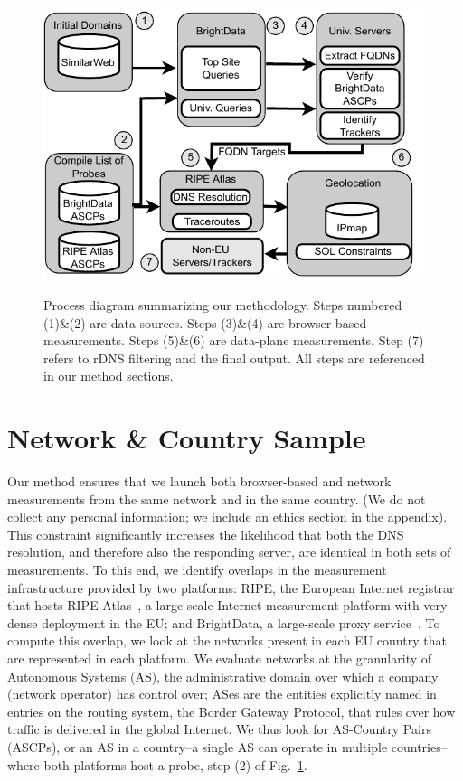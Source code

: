 

\begin{figure}
\vspace{-4mm}
    \centering
    \includegraphics[width=.46\textwidth]{figures/DataLoc-Methodology-v2.pdf}\\
    \caption{Process diagram summarizing our methodology. Steps numbered (1)\&(2) are data sources. 
Steps (3)\&(4) are browser-based measurements. Steps (5)\&(6) are data-plane measurements. 
Step (7) refers to rDNS filtering and the final output. All steps are referenced in our method sections.}
\label{fig:methodoverview}
\vspace{-4mm}
\end{figure}

\section{Network \& Country Sample}
Our method ensures that we launch both browser-based and network measurements
from the same network and in the same country. (We do not collect any personal 
information; we include an ethics section in the appendix). This constraint significantly increases the likelihood 
that both the DNS resolution, and therefore also the responding server, are 
identical in both sets of measurements. To this end, we identify overlaps in the
measurement infrastructure provided by two platforms: RIPE, the European Internet registrar
that hosts RIPE Atlas~\cite{atlas}, a large-scale Internet measurement
platform with very dense deployment in the EU; and BrightData, a large-scale proxy service~\cite{BrightData}.
To compute this overlap, we look at the networks present in each EU country that are represented
in each platform. We evaluate networks at the granularity of Autonomous Systems (AS),
the administrative domain over which a company (network operator) has control over;
ASes are the entities explicitly named in entries on the routing system, the Border Gateway Protocol, that rules
over how traffic is delivered in the global Internet. 
We thus look for AS-Country Pairs (ASCPs), or an AS in a country--a single AS can operate in 
multiple countries--where both platforms host a probe, step (2) of Fig.~\ref{fig:methodoverview}.

